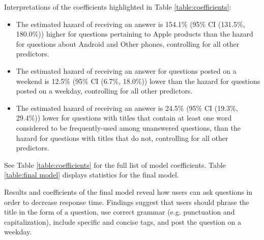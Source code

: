 \documentclass{article}
\begin{document}
Interpretations of the coefficients highlighted in Table \ref{table:coefficients}:

\begin{itemize}
  \item The estimated hazard of receiving an answer is 154.1\% (95\% CI (131.5\%, 180.0\%)) higher for questions pertaining to Apple products than the hazard for questions about Android and Other phones, controlling for all other predictors.
  \item The estimated hazard of receiving an answer for questions posted on a weekend is 12.5\% (95\% CI (6.7\%, 18.0\%)) lower than the hazard for questions posted on a weekday, controlling for all other predictors.
  \item The estimated hazard of receiving an answer is 24.5\% (95\% CI (19.3\%, 29.4\%)) lower for questions with titles that contain at least one word considered to be frequently-used among unanswered questions, than the hazard for questions with titles that do not, controlling for all other predictors. 
\end{itemize}

See Table \ref{table:coefficients} for the full list of model coefficients. Table \ref{table:final model} displays statistics for the final model. 

Results and coefficients of the final model reveal how users can ask questions in order to decrease response time. Findings suggest that users should phrase the title in the form of a question, use correct grammar (e.g. punctuation and capitalization), include specific and concise tags, and post the question on a weekday. 
\end{document}
